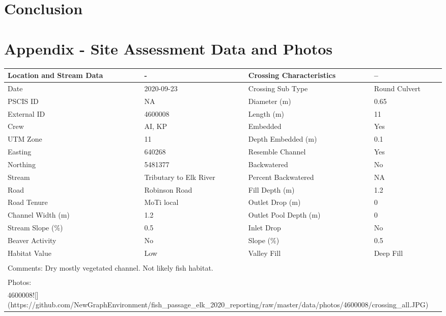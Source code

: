 \documentclass[
]{book}
\begin{document}
\hypertarget{conclusion}{%
\chapter{Conclusion}\label{conclusion}}

\hypertarget{appendix---site-assessment-data-and-photos}{%
\chapter*{Appendix - Site Assessment Data and Photos}\label{appendix---site-assessment-data-and-photos}}

\begin{tabular}{l|l|l|l}
\hline
Location and Stream Data & - & Crossing Characteristics & --\\
\hline
Date & 2020-09-23 & Crossing Sub Type & Round Culvert\\
\hline
PSCIS ID & NA & Diameter (m) & 0.65\\
\hline
External ID & 4600008 & Length (m) & 11\\
\hline
Crew & AI, KP & Embedded & Yes\\
\hline
UTM Zone & 11 & Depth Embedded (m) & 0.1\\
\hline
Easting & 640268 & Resemble Channel & Yes\\
\hline
Northing & 5481377 & Backwatered & No\\
\hline
Stream & Tributary to Elk River & Percent Backwatered & NA\\
\hline
Road & Robinson Road & Fill Depth (m) & 1.2\\
\hline
Road Tenure & MoTi local & Outlet Drop (m) & 0\\
\hline
Channel Width (m) & 1.2 & Outlet Pool Depth (m) & 0\\
\hline
Stream Slope (\%) & 0.5 & Inlet Drop & No\\
\hline
Beaver Activity & No & Slope (\%) & 0.5\\
\hline
Habitat Value & Low & Valley Fill & Deep Fill\\
\hline
\multicolumn{4}{l}{\textsuperscript{} Comments: Dry mostly vegetated channel. Not likely fish habitat.}\\
\multicolumn{4}{l}{\textsuperscript{} Photos:}\\
\multicolumn{4}{l}{4600008![](https://github.com/NewGraphEnvironment/fish\_passage\_elk\_2020\_reporting/raw/master/data/photos/4600008/crossing\_all.JPG)}\\
\end{tabular}
\end{document}
